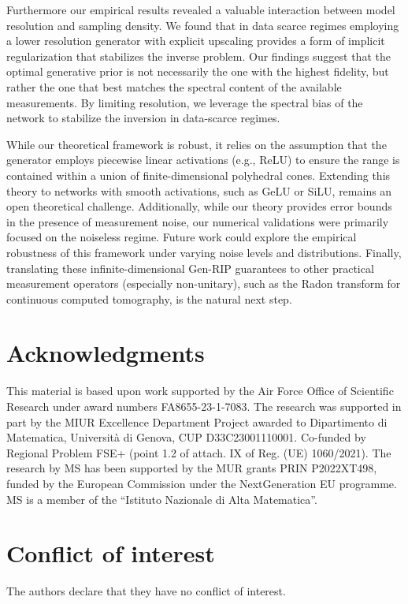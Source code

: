 \documentclass[a4paper,oneside]{amsart}
\begin{document}
Furthermore our empirical results revealed a valuable interaction between model resolution and sampling density. We found that in data scarce regimes employing a lower resolution generator with explicit upscaling provides a form of implicit regularization that stabilizes the inverse problem. Our findings suggest that the optimal generative prior is not necessarily the one with the highest fidelity, but rather the one that best matches the spectral content of the available measurements. By limiting resolution, we leverage the spectral bias of the network \cite{rahaman2019spectral} to stabilize the inversion in data-scarce regimes.

While our theoretical framework is robust, it relies on the assumption that the generator employs piecewise linear activations (e.g., ReLU) to ensure the range is contained within a union of finite-dimensional polyhedral cones. Extending this theory to networks with smooth activations, such as GeLU or SiLU, remains an open theoretical challenge. Additionally, while our theory provides error bounds in the presence of measurement noise, our numerical validations were primarily focused on the noiseless regime. Future work could explore the empirical robustness of this framework under varying noise levels and distributions. Finally, translating these infinite-dimensional Gen-RIP guarantees to other practical measurement operators (especially non-unitary), such as the Radon transform for continuous computed tomography, is the natural next step.

\section*{Acknowledgments}
This material is based upon work supported by the Air Force Office of Scientific Research under award numbers FA8655-23-1-7083. The research was supported in part by the MIUR Excellence Department Project awarded to Dipartimento di Matematica, Università di Genova, CUP D33C23001110001.  Co-funded by Regional Problem FSE+ (point 1.2 of attach. IX of Reg. (UE) 1060/2021). The research by MS has been supported by the MUR grants PRIN P2022XT498, funded by the European Commission under the NextGeneration EU programme. MS is a member of the ``Istituto Nazionale di Alta Matematica''.

\section*{Conflict of interest}
		The authors declare that they have no conflict of interest.



\end{document}
